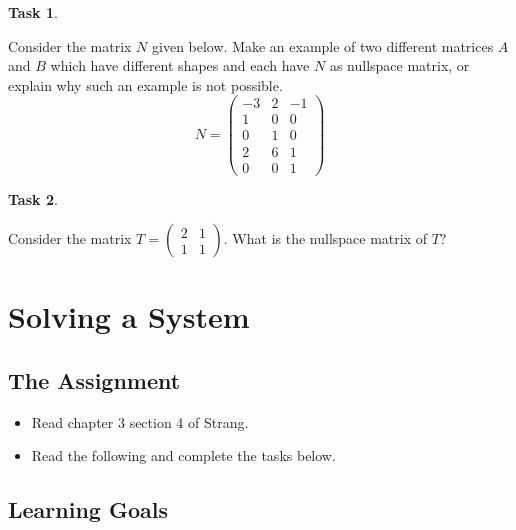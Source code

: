 \documentclass[10pt,]{book}
\theoremstyle{plain}
\theoremstyle{definition}
\numberwithin{equation}{section}
\newtheorem{task}{Task}[chapter]
\begin{document}
\begin{task}
\label{task-98}

        Consider the matrix \(N\) given below. Make an example of two
        different matrices \(A\) and \(B\) which have different shapes
        and each have \(N\) as nullspace matrix, or explain why such an
        example is not possible.
        \[
        N = \begin{pmatrix}
        -3 & 2 & -1 \\
         1 & 0 &  0 \\
         0 & 1 &  0 \\
         2 & 6 &  1 \\
         0 & 0 &  1
        \end{pmatrix}
        \]\end{task}
\begin{task}
\label{task-99}

        Consider the matrix \(T = \left(\begin{smallmatrix} 2 &
        1 \\ 1 & 1 \end{smallmatrix}\right)\). What is the nullspace
        matrix of \(T\)?
      \end{task}
\clearpage
\typeout{************************************************}
\typeout{************************************************}
\section[Solving a System]{Solving a System}\label{complete-solution}
\typeout{************************************************}
\typeout{************************************************}
\subsection[The Assignment]{The Assignment}\label{subsection-73}
\begin{itemize}
\item{}Read chapter 3 section 4 of Strang.\item{}Read the following and complete the tasks below.\end{itemize}
\typeout{************************************************}
\typeout{************************************************}
\subsection[Learning Goals]{Learning Goals}\label{subsection-74}
\end{document}
